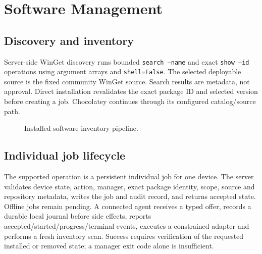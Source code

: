 \documentclass[12pt,a4paper]{report}
\begin{document}
\section{Software Management}

\subsection{Discovery and inventory}
Server-side WinGet discovery runs bounded \texttt{search --name} and exact
\texttt{show --id} operations using argument arrays and \texttt{shell=False}.
The selected deployable source is the fixed community WinGet source. Search
results are metadata, not approval. Direct installation revalidates the exact
package ID and selected version before creating a job. Chocolatey continues
through its configured catalog/source path.

\begin{figure}[H]
\centering
{}
\caption{Installed software inventory pipeline.}
\label{fig:software-inventory-flow}
\end{figure}

\subsection{Individual job lifecycle}
The supported operation is a persistent individual job for one device. The
server validates device state, action, manager, exact package identity, scope,
source and repository metadata, writes the job and audit record, and returns
accepted state. Offline jobs remain pending. A connected agent receives a
typed offer, records a durable local journal before side effects, reports
accepted/started/progress/terminal events, executes a constrained adapter and
performs a fresh inventory scan. Success requires verification of the
requested installed or removed state; a manager exit code alone is
insufficient.
\end{document}
